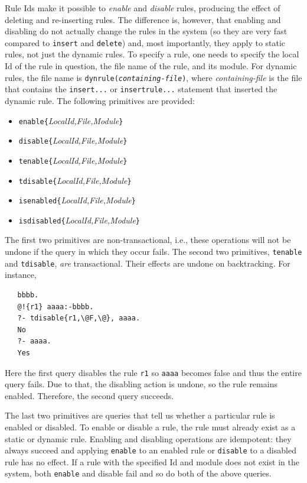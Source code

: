 \documentclass[11pt]{article}
\begin{document}
Rule Ids make it possible to \emph{enable} and \emph{disable} rules,
producing the effect of deleting and re-inserting rules.
The difference is, however, that enabling and disabling do not actually
change the rules in the system (so they are very fast compared to
\texttt{insert} and \texttt{delete}) and, most importantly, they apply to
static rules, not just the dynamic rules.  To specify a rule, one needs to
specify the local Id of the rule in question, the file name of the rule,
and its module. For dynamic rules, the file name is
\texttt{dynrule(\textnormal{\emph{containing-file}})},
where \emph{containing-file} is the file that contains the
\texttt{insert{...}} or \texttt{insertrule{...}} statement that inserted
the dynamic rule.  
The following
primitives are provided:
\begin{itemize}
\item \texttt{enable\{}\emph{LocalId,File,Module}\texttt{\}} 
\item \texttt{disable\{}\emph{LocalId,File,Module}\texttt{\}} 
\item \texttt{tenable\{}\emph{LocalId,File,Module}\texttt{\}}  
\item \texttt{tdisable\{}\emph{LocalId,File,Module}\texttt{\}}  
\item \texttt{isenabled\{}\emph{LocalId,File,Module}\texttt{\}}  
\item \texttt{isdisabled\{}\emph{LocalId,File,Module}\texttt{\}}  
\end{itemize}
The first two primitives are non-transactional, i.e., these operations will
not be undone if the query in which they occur fails.
The second two primitives, \texttt{tenable} and \texttt{tdisable},
\emph{are} transactional. Their effects are undone on backtracking. For
instance, 
\begin{verbatim}
   bbbb.
   @!{r1} aaaa:-bbbb.
   ?- tdisable{r1,\@F,\@}, aaaa.
   No
   ?- aaaa.
   Yes
\end{verbatim}
Here the first query disables the rule \texttt{r1} so \texttt{aaaa} becomes
false and thus the entire query fails. Due to that, the disabling action is
undone, so the rule remains enabled. Therefore, the second query succeeds.

The last two primitives are queries that tell us whether a particular rule
is enabled or disabled. To enable or disable a rule, the rule must already
exist as a static or dynamic rule. Enabling  and disabling operations are
idempotent: they always succeed and applying \texttt{enable} to an enabled
rule or \texttt{disable} to a disabled rule has no effect.  
If a rule with the specified Id and module does not exist in the system,
both \texttt{enable} and disable fail and so do both of the above queries.
\end{document}
